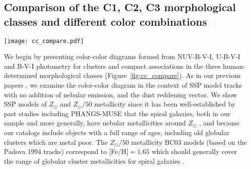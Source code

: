 \documentclass[linenumbers]{aastex63}
\begin{document}
\subsection{Comparison of the C1, C2, C3 morphological classes and different color combinations}\label{ssect:cc_overview}
\begin{figure*} 
\texttt{[image: cc\_compare.pdf]}
 \caption{Color-color diagrams for the PHANGS-HST human classified sample, with each morphological class shown separately: C1 single-peaked symmetric clusters (left column); C2 single-peaked asymmetric clusters (middle column); and C3 multi-peaked compact associations (right column). In all panels V-I is plotted along the horizontal axis, and three other colors are shown along the vertical axis: NUV-B (top row), U-B (middle row) and B-V (bottom row).  We only show data points for clusters which are detected with at least a ${\rm S/N > 3}$ in the plotted bands. 
 Individual clusters are represented by black dots whereas in crowded regions we show a Gaussian-smoothed heat map indicating the relative density. 
 The size of the smoothing kernel is shown by a red circle on the top middle panel.
 A cyan track denotes the  SSP model for ${\rm Z_{\odot}}$ metallicity at ages from 1\,Myr till 13.7\,Gyr. The portion of the SSP track ${\rm Z_{\odot}/50}$ metallicity from 0.5-13.7\,Gyr is also shown with a magenta track. Key ages are indicated on the right column and are marked with blue and pink dots on each track.  A reddening vector (top right of each panel) corresponds to ${\rm A_v = 1.0 mag}$. In panel d), we indicate names for relevant loci in the color-color space.}
 \label{fig:cc_compare}
\end{figure*}
We begin by presenting color-color diagrams formed from NUV-B-V-I, U-B-V-I and B-V-I photometry for clusters and compact associations in the three human-determined morphological classes (Figure~\ref{fig:cc_compare}).  As in our previous papers \citep[e.g.,][]{turner_phangs-hst_2021,lee_phangs-hst_2022,deger_bright_2022}, we examine the color-color diagram in the context of   SSP model tracks {with no addition of nebular emission,} and the dust reddening vector.  We show SSP models of $Z_{\odot}$ and $Z_{\odot}/50$ metallicity {since it has been well-established by past studies} including PHANGS-MUSE that the spiral galaxies, both in our sample and more generally, have nebular metallicities around $Z_{\odot}$ \citep[e.g.,][]{zkh94, skillman_virgo_96, moustakas10, groves_phangs-muse_2023, scheuermann_stellar_2023}, and because our catalogs include objects with a full range of ages, including old globular clusters which are metal poor. The $Z_{\odot}/50$ metallicity BC03 models (based on the Padova 1994 tracks) correspond to $[$Fe/H$]=1.65$ which should generally cover the range of globular cluster metallicities for spiral galaxies \citep[][and references therein]{BS06}. 
\end{document}
